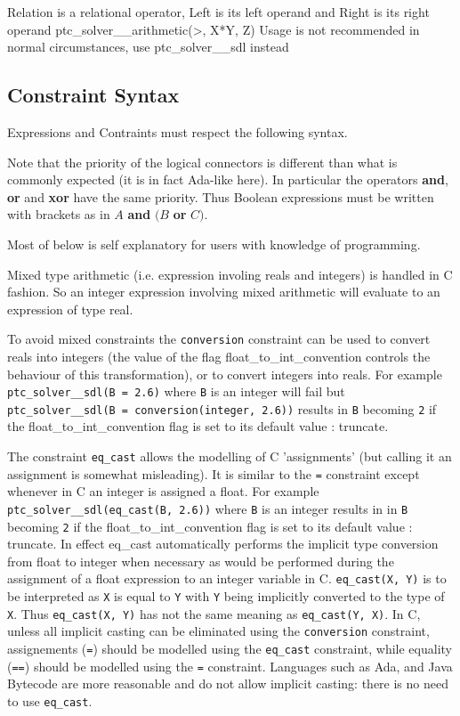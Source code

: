 \documentclass{article}
\begin{document}
        {Relation is a relational operator, Left is its left operand and Right is
its right operand}
        {ptc\_solver\_\_arithmetic(>, X*Y, Z)}
        {Usage is not recommended in normal circumstances, use ptc\_solver\_\_sdl
instead}


\subsection{Constraint Syntax}

Expressions and Contraints must respect the following syntax.

Note that the priority of the logical connectors is different than  what is
commonly expected (it is in fact Ada-like here). In particular the operators
\textbf{and}, \textbf{or} and \textbf{xor} have the same
priority. Thus Boolean expressions must be written with brackets as in $A$
\textbf{and} $(B$ \textbf{or} $C)$.

Most of below is self explanatory for users with knowledge of programming.

Mixed type arithmetic (i.e. expression involing reals and integers) is handled in
C fashion. So an integer expression involving mixed arithmetic will evaluate to
an expression of type real.

To avoid mixed constraints the \texttt{conversion} constraint can be used to
convert reals into integers (the value of the flag float\_to\_int\_convention
controls the behaviour of this transformation), or to convert integers into
reals. For example \texttt{ptc\_solver\_\_sdl(B = 2.6)} where \texttt{B} is an
integer will fail but \texttt{ptc\_solver\_\_sdl(B = conversion(integer, 2.6))}
results in \texttt{B} becoming \texttt{2} if the float\_to\_int\_convention flag
is set to its default value : truncate.

The constraint \texttt{eq\_cast} allows the modelling of C 'assignments' (but calling it an assignment is somewhat misleading). It is
similar to the \texttt{=} constraint except whenever in C an integer is assigned
a float. For example \texttt{ptc\_solver\_\_sdl(eq\_cast(B, 2.6))} where
\texttt{B} is an integer results in in \texttt{B} becoming \texttt{2} if the
float\_to\_int\_convention flag is set to its default value : truncate. In effect
eq\_cast automatically performs the implicit type conversion from float to
integer when necessary as would be performed during the assignment of a float
expression to an integer variable in C. \texttt{eq\_cast(X, Y)} is to be
interpreted as \texttt{X} is equal to \texttt{Y} with \texttt{Y} being implicitly
converted to the type of \texttt{X}. Thus \texttt{eq\_cast(X, Y)} has not the
same meaning as \texttt{eq\_cast(Y, X)}. In C, unless all implicit casting can be
eliminated using the \texttt{conversion} constraint, assignements (\texttt{=})
should be modelled using the \texttt{eq\_cast} constraint, while equality
(\texttt{==}) should be modelled using the \texttt{=} constraint. Languages such
as Ada, and Java Bytecode are more reasonable and do not allow implicit casting:
there is no need to use \texttt{eq\_cast}.
\end{document}
